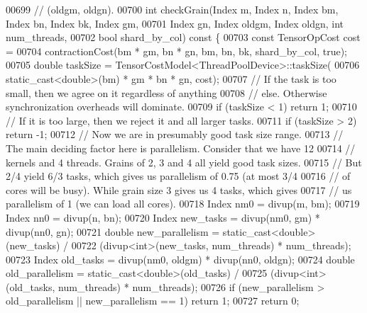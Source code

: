 \begin{DoxyCode}
00699   \textcolor{comment}{// (oldgm, oldgn).}
00700   \textcolor{keywordtype}{int} checkGrain(Index m, Index n, Index bm, Index bn, Index bk, Index gm,
00701                  Index gn, Index oldgm, Index oldgn, \textcolor{keywordtype}{int} num\_threads,
00702                  \textcolor{keywordtype}{bool} shard\_by\_col)\textcolor{keyword}{ const }\{
00703     \textcolor{keyword}{const} TensorOpCost cost =
00704         contractionCost(bm * gm, bn * gn, bm, bn, bk, shard\_by\_col, \textcolor{keyword}{true});
00705     \textcolor{keywordtype}{double} taskSize = TensorCostModel<ThreadPoolDevice>::taskSize(
00706         static\_cast<double>(bm) * gm * bn * gn, cost);
00707     \textcolor{comment}{// If the task is too small, then we agree on it regardless of anything}
00708     \textcolor{comment}{// else. Otherwise synchronization overheads will dominate.}
00709     \textcolor{keywordflow}{if} (taskSize < 1) \textcolor{keywordflow}{return} 1;
00710     \textcolor{comment}{// If it is too large, then we reject it and all larger tasks.}
00711     \textcolor{keywordflow}{if} (taskSize > 2) \textcolor{keywordflow}{return} -1;
00712     \textcolor{comment}{// Now we are in presumably good task size range.}
00713     \textcolor{comment}{// The main deciding factor here is parallelism. Consider that we have 12}
00714     \textcolor{comment}{// kernels and 4 threads. Grains of 2, 3 and 4 all yield good task sizes.}
00715     \textcolor{comment}{// But 2/4 yield 6/3 tasks, which gives us parallelism of 0.75 (at most 3/4}
00716     \textcolor{comment}{// of cores will be busy). While grain size 3 gives us 4 tasks, which gives}
00717     \textcolor{comment}{// us parallelism of 1 (we can load all cores).}
00718     Index nm0 = divup(m, bm);
00719     Index nn0 = divup(n, bn);
00720     Index new\_tasks = divup(nm0, gm) * divup(nn0, gn);
00721     \textcolor{keywordtype}{double} new\_parallelism = \textcolor{keyword}{static\_cast<}\textcolor{keywordtype}{double}\textcolor{keyword}{>}(new\_tasks) /
00722                              (divup<int>(new\_tasks, num\_threads) * num\_threads);
00723     Index old\_tasks = divup(nm0, oldgm) * divup(nn0, oldgn);
00724     \textcolor{keywordtype}{double} old\_parallelism = \textcolor{keyword}{static\_cast<}\textcolor{keywordtype}{double}\textcolor{keyword}{>}(old\_tasks) /
00725                              (divup<int>(old\_tasks, num\_threads) * num\_threads);
00726     \textcolor{keywordflow}{if} (new\_parallelism > old\_parallelism || new\_parallelism == 1) \textcolor{keywordflow}{return} 1;
00727     \textcolor{keywordflow}{return} 0;

\end{DoxyCode}
